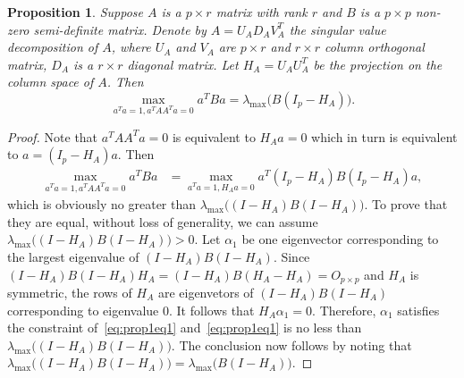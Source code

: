 \documentclass[review]{elsarticle}
\theoremstyle{plain}
\newtheorem{proposition}{\quad\quad Proposition}
\theoremstyle{definition}
\theoremstyle{remark}
\begin{document}
\begin{proposition}\label{optProp}
    Suppose $A$ is a $p\times r$ matrix with rank $r$ and $B$ is a $p\times p$  non-zero semi-definite matrix.
    Denote by $A=U_A D_A V_A^T$ the singular value decomposition of $A$, where $U_A$ and $V_A$ are $p\times r$ and $r\times r$ column orthogonal matrix, $D_A$ is a $r\times r$ diagonal matrix.
    Let $H_A=U_A U_A^T$ be the projection on the column space of $A$.
    Then
    \begin{equation}
        \max_{a^T a=1, a^T A A^T a=0}a^T B a=
        \lambda_{\max}\big(B(I_p-H_A)\big).
    \end{equation}
\end{proposition}
\begin{proof}
    Note that $a^T A A^T a=0$ is equivalent to $H_A a=0$ which in turn is equivalent to $a= (I_p-H_A)a$.
    Then
    \begin{equation}\label{eq:prop1eq1}
        \begin{aligned}
        \max_{a^T a=1, a^T A A^T a=0}a^T B a
            &=
        \max_{a^T a=1, H_A a=0}a^T(I_p-H_A) B (I_p-H_A)a,
        \end{aligned}
    \end{equation}
    which is obviously no greater than $\lambda_{\max}\big((I-H_A)B(I-H_A)\big)$.
    To prove that they are equal,  without loss of generality, we can assume $\lambda_{\max}\big((I-H_A)B(I-H_A)\big)>0$.
    Let $\alpha_1$ be one eigenvector corresponding to the largest eigenvalue of $(I-H_A)B(I-H_A)$.
    Since $(I-H_A)B(I-H_A)H_A=(I-H_A)B(H_A-H_A)=O_{p\times p}$ and $H_A$ is symmetric, the rows of $H_A$ are eigenvetors of $(I-H_A)B(I-H_A)$ corresponding to eigenvalue $0$.
    It follows that $H_A\alpha_1=0$.
    Therefore, $\alpha_1$ satisfies the constraint of~\eqref{eq:prop1eq1} and~\eqref{eq:prop1eq1} is no less than $\lambda_{\max}\big((I-H_A)B(I-H_A)\big)$.
    The conclusion now follows by noting that $\lambda_{\max}\big((I-H_A)B(I-H_A)\big)=\lambda_{\max}\big( B(I-H_A)\big)$.
    
\end{proof}
\end{document}

